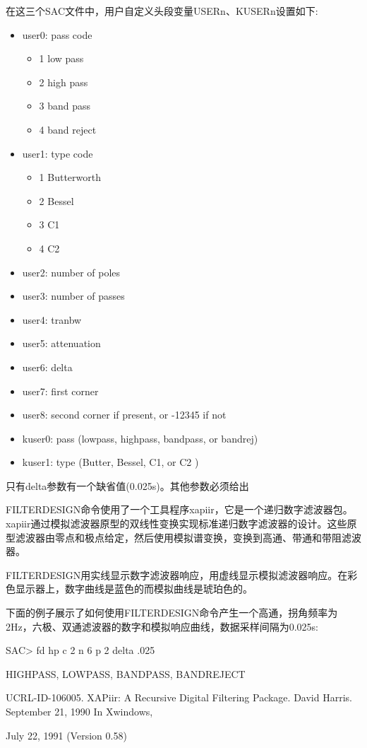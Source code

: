 在这三个SAC文件中，用户自定义头段变量USERn、KUSERn设置如下:
\begin{itemize}
\item user0:  pass code
	\begin{itemize}
	\item 1 low pass
	\item 2 high pass
 	\item 3 band pass
	\item 4 band reject
	\end{itemize}
\item user1:  type code
	\begin{itemize}
	\item 1 Butterworth
	\item 2 Bessel
	\item 3 C1
	\item 4 C2
	\end{itemize}
\item user2:  number of poles
\item user3:  number of passes
\item user4:  tranbw
\item user5:  attenuation
\item user6:  delta
\item user7:  first corner
\item user8:  second corner if present, or -12345 if not
\item kuser0: pass (lowpass, highpass, bandpass, or bandrej)
\item kuser1: type (Butter, Bessel, C1, or C2 )
\end{itemize}

只有delta参数有一个缺省值(0.025s)。其他参数必须给出

FILTERDESIGN命令使用了一个工具程序xapiir，它是一个递归数字滤波器包。xapiir通过模拟滤波器原型的双线性变换实现标准递归数字滤波器的设计。这些原型滤波器由零点和极点给定，然后使用模拟谱变换，变换到高通、带通和带阻滤波器。

FILTERDESIGN用实线显示数字滤波器响应，用虚线显示模拟滤波器响应。在彩色显示器上，数字曲线是蓝色的而模拟曲线是琥珀色的。

下面的例子展示了如何使用FILTERDESIGN命令产生一个高通，拐角频率为2Hz，六极、双通滤波器的数字和模拟响应曲线，数据采样间隔为0.025s:
\begin{SACCode}
SAC> fd hp c 2 n 6 p 2 delta .025
\end{SACCode}

HIGHPASS, LOWPASS, BANDPASS, BANDREJECT

UCRL-ID-106005. XAPiir: A Recursive Digital Filtering Package. David Harris.
September 21, 1990 In Xwindows,

July 22, 1991 (Version 0.58)
